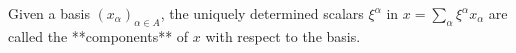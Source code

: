 Given a basis $(x_\alpha)_{\alpha \in A}$, the uniquely determined scalars $\xi^\alpha$ in $x = \sum_\alpha \xi^\alpha x_\alpha$ are called the **components** of $x$ with respect to the basis.
